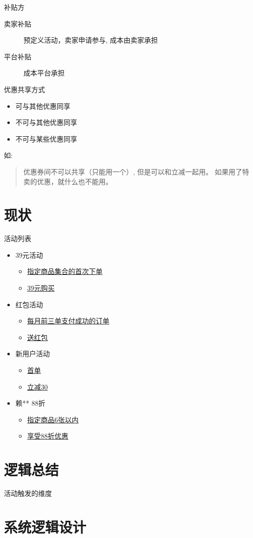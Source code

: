 \documentclass[presentation, bigger]{beamer}
\begin{document}
\begin{frame}[label={sec:orgheadline4}]{补贴方}
\begin{description}
\item[{卖家补贴 }] 预定义活动，卖家申请参与, 成本由卖家承担
\item[{平台补贴}] 成本平台承担
\end{description}
\end{frame}

\begin{frame}[label={sec:orgheadline5}]{优惠共享方式}
\begin{itemize}
\item 可与其他优惠同享
\item 不可与其他优惠同享
\item 不可与某些优惠同享
\end{itemize}

\begin{block}{如:}
\begin{quote}
优惠券间不可以共享（只能用一个）, 但是可以和立减一起用。 如果用了特卖的优惠，就什么也不能用。
\end{quote}
\end{block}
\end{frame}

\section{现状}
\label{sec:orgheadline8}
\begin{frame}[label={sec:orgheadline7}]{活动列表}
\begin{itemize}
\item 39元活动
\begin{itemize}
\item \uline{指定商品集合的首次下单}
\item \uline{39元购买}
\end{itemize}
\item 红包活动
\begin{itemize}
\item \uline{每月前三单支付成功的订单}
\item \uline{送红包}
\end{itemize}
\item 新用户活动
\begin{itemize}
\item \uline{首单}
\item \uline{立减30}
\end{itemize}
\item 赖** 88折
\begin{itemize}
\item \uline{指定商品6张以内}
\item \uline{享受88折优惠}
\end{itemize}
\end{itemize}
\end{frame}

\section{逻辑总结}
\label{sec:orgheadline10}

\begin{frame}[label={sec:orgheadline9}]{活动触发的维度}
\end{frame}


\section{系统逻辑设计}
\label{sec:orgheadline11}
\end{document}
